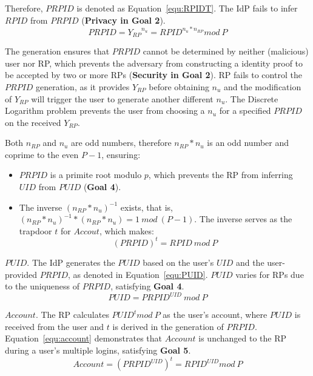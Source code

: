 Therefore, $PRPID$ is denoted as Equation~\ref{equ:RPIDT}. The IdP fails to infer ${RPID}$ from $PRPID$ (\textbf{Privacy in Goal 2}).
   \begin{equation}
   PRPID = {Y_{RP}}^{n_{u}} = {RPID}^{n_{u}* n_{RP}} mod \ P
   \label{equ:RPIDT}
   \end{equation}

The generation ensures that $PRPID$ cannot be determined by neither (malicious) user nor RP, which prevents the adversary from constructing a identity proof to be accepted by two or more RPs (\textbf{Security in Goal 2}). RP fails to control the $PRPID$ generation, as it provides $Y_{RP}$ before obtaining $n_{u}$ and the modification of $Y_{RP}$ will trigger the user to generate another different  $n_{u}$. The Discrete Logarithm problem prevents the user from choosing a $n_{u}$ for a specified $PRPID$ on the received $Y_{RP}$.

Both $n_{RP}$ and $n_{u}$ are odd numbers, therefore $n_{RP}*n_{u}$ is an odd number and coprime to the even $P-1$, ensuring:
 \begin{itemize}
   \item $PRPID$ is a primite root modulo $p$, which prevents the RP from inferring $UID$ from $PUID$ (\textbf{Goal 4}).
   \item The inverse $(n_{RP}*n_{u})^{-1}$ exists, that is, $(n_{RP}*n_{u})^{-1} * (n_{RP}*n_{u}) = 1 \ mod \ (P-1)$. The inverse  serves as  the trapdoor $t$ for $Accout$, which makes:
   \begin{equation}
   (PRPID)^t = RPID \ mod \ P
   \label{equ:trapdoor}
   \end{equation}
 \end{itemize}

{$PUID$}. The IdP generates the $PUID$ based on the user's $UID$ and the user-provided $PRPID$, as denoted in Equation~\ref{equ:PUID}. $PUID$ varies for RPs due to the uniqueness of $PRPID$, satisfying \textbf{Goal 4}.
 \begin{equation}
   PUID = {PRPID}^{UID} \ mod \ P
   \label{equ:PUID}
   \end{equation}

{$Account$}. The RP calculates $PUID^t mod \ P$ as the  user's account, where $PUID$ is received from the user and $t$ is derived in the generation of $PRPID$. Equation~\ref{equ:account} demonstrates that $Account$ is unchanged to the RP during a user's multiple logins, satisfying \textbf{Goal 5}.
 \begin{equation}
   Account = ({PRPID}^{UID})^t = {RPID}^{UID} mod \ P
   \label{equ:account}
   \end{equation}


